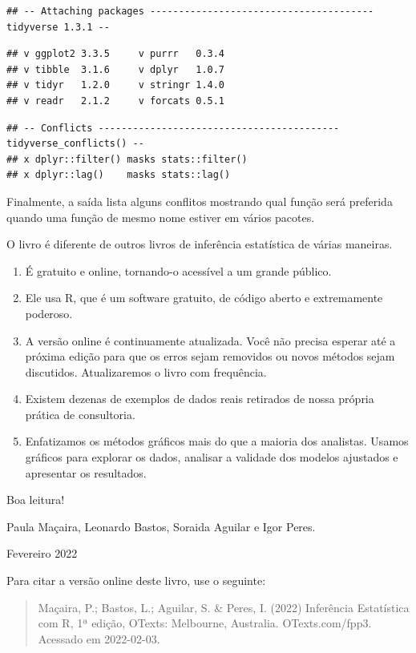 \documentclass[
]{book}
\providecommand{\tightlist}{%
  \setlength{\itemsep}{0pt}\setlength{\parskip}{0pt}}
\begin{document}
\begin{verbatim}
## -- Attaching packages --------------------------------------- tidyverse 1.3.1 --
\end{verbatim}

\begin{verbatim}
## v ggplot2 3.3.5     v purrr   0.3.4
## v tibble  3.1.6     v dplyr   1.0.7
## v tidyr   1.2.0     v stringr 1.4.0
## v readr   2.1.2     v forcats 0.5.1
\end{verbatim}

\begin{verbatim}
## -- Conflicts ------------------------------------------ tidyverse_conflicts() --
## x dplyr::filter() masks stats::filter()
## x dplyr::lag()    masks stats::lag()
\end{verbatim}

Finalmente, a saída lista alguns conflitos mostrando qual função será preferida quando uma função de mesmo nome estiver em vários pacotes.

O livro é diferente de outros livros de inferência estatística de várias maneiras.

\begin{enumerate}
\def\labelenumi{\arabic{enumi}.}
\tightlist
\item
  É gratuito e online, tornando-o acessível a um grande público.
\item
  Ele usa R, que é um software gratuito, de código aberto e extremamente poderoso.
\item
  A versão online é continuamente atualizada. Você não precisa esperar até a próxima edição para que os erros sejam removidos ou novos métodos sejam discutidos. Atualizaremos o livro com frequência.
\item
  Existem dezenas de exemplos de dados reais retirados de nossa própria prática de consultoria.
\item
  Enfatizamos os métodos gráficos mais do que a maioria dos analistas. Usamos gráficos para explorar os dados, analisar a validade dos modelos ajustados e apresentar os resultados.
\end{enumerate}

Boa leitura!

Paula Maçaira, Leonardo Bastos, Soraida Aguilar e Igor Peres.

Fevereiro 2022

Para citar a versão online deste livro, use o seguinte:

\begin{quote}
Maçaira, P.; Bastos, L.; Aguilar, S. \& Peres, I. (2022) Inferência Estatística com R, 1ª edição, OTexts: Melbourne, Australia. OTexts.com/fpp3. Acessado em 2022-02-03.
\end{quote}
\end{document}
